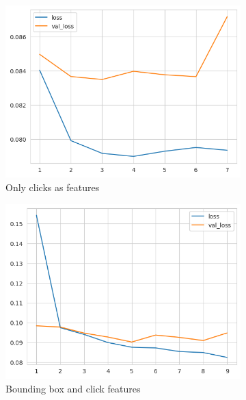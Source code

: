 \begin{figure}[htbp!]
  \centering
  \begin{subfigure}[b]{0.45\textwidth}
    \centering
    \includegraphics[width=\textwidth]{graphics/model_history_loss_clicks}
    \caption{Only clicks as features}
    \label{fig:model_history_loss_clicks}
  \end{subfigure}
  \hfill
  \begin{subfigure}[b]{0.45\textwidth}
    \centering
    \includegraphics[width=\textwidth]{graphics/model_history_loss_features}
    \caption{Bounding box and click features}
    \label{fig:model_history_loss_features}
  \end{subfigure}
  \hfill
  \begin{subfigure}[b]{0.8\textwidth}

\end{subfigure}
\end{figure}
